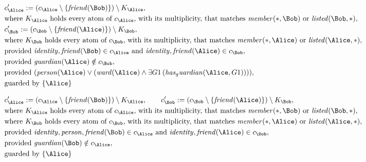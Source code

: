 \begin{align*}
&
c'_
{
\Alice
}
 := 
(c_
{
\Alice
}
 \setminus 
\{
\mathit{
friend
}
(
\Bob
)
\}
) \setminus K_
{
\Alice
}
,\\
&
\text{where } K_
{
\Alice
}
 \text{ holds every atom of } c_
{
\Alice
}
 \text{, with its multiplicity, that matches } 
\mathit{
member
}
(
\ast
,
\Bob
)
 \text{ or } 
\mathit{
listed
}
(
\Bob
,
\ast
)
,\\
&
c'_
{
\Bob
}
 := 
(c_
{
\Bob
}
 \setminus 
\{
\mathit{
friend
}
(
\Alice
)
\}
) \setminus K_
{
\Bob
}
,\\
&
\text{where } K_
{
\Bob
}
 \text{ holds every atom of } c_
{
\Bob
}
 \text{, with its multiplicity, that matches } 
\mathit{
member
}
(
\ast
,
\Alice
)
 \text{ or } 
\mathit{
listed
}
(
\Alice
,
\ast
)
,\\
&
\text{provided } 
\mathit{
identity
}
,
\mathit{
friend
}
(
\Bob
)
 \in c_
{
\Alice
}
 \text{ and } 
\mathit{
identity
}
,
\mathit{
friend
}
(
\Alice
)
 \in c_
{
\Bob
}
,\\
&
\text{provided } 
\mathit{
guardian
}
(
\Alice
)
 \notin c_
{
\Bob
}
,\\
&
\text{provided } 
(
\mathit{
person
}
(
\Alice
)
\lor
(
\mathit{
ward
}
(
\Alice
)
\land
\exists 
G1
\,(
\mathit{
has_guardian
}
(
\Alice
,
G1
)
)
)
)
,\\
&
\text{guarded by } \{
\Alice
\}
\end{align*}

\begin{align*}
&
c'_
{
\Alice
}
 := 
(c_
{
\Alice
}
 \setminus 
\{
\mathit{
friend
}
(
\Bob
)
\}
) \setminus K_
{
\Alice
}
, \qquad 
c'_
{
\Bob
}
 := 
(c_
{
\Bob
}
 \setminus 
\{
\mathit{
friend
}
(
\Alice
)
\}
) \setminus K_
{
\Bob
}
,\\
&
\text{where } K_
{
\Alice
}
 \text{ holds every atom of } c_
{
\Alice
}
 \text{, with its multiplicity, that matches } 
\mathit{
member
}
(
\ast
,
\Bob
)
 \text{ or } 
\mathit{
listed
}
(
\Bob
,
\ast
)
,\\
&
\text{where } K_
{
\Bob
}
 \text{ holds every atom of } c_
{
\Bob
}
 \text{, with its multiplicity, that matches } 
\mathit{
member
}
(
\ast
,
\Alice
)
 \text{ or } 
\mathit{
listed
}
(
\Alice
,
\ast
)
,\\
&
\text{provided } 
\mathit{
identity
}
,
\mathit{
person
}
,
\mathit{
friend
}
(
\Bob
)
 \in c_
{
\Alice
}
 \text{ and } 
\mathit{
identity
}
,
\mathit{
friend
}
(
\Alice
)
 \in c_
{
\Bob
}
,\\
&
\text{provided } 
\mathit{
guardian
}
(
\Bob
)
 \notin c_
{
\Alice
}
,\\
&
\text{guarded by } \{
\Alice
\}
\end{align*}
